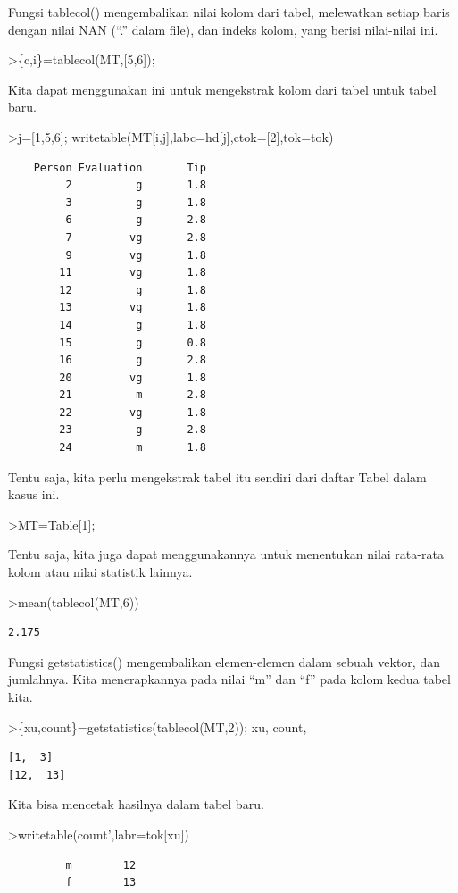 \documentclass[
]{book}
\begin{document}
Fungsi tablecol() mengembalikan nilai kolom dari tabel, melewatkan setiap baris dengan nilai NAN (``.'' dalam file), dan indeks kolom, yang berisi nilai-nilai ini.

\textgreater\{c,i\}=tablecol(MT,{[}5,6{]});

Kita dapat menggunakan ini untuk mengekstrak kolom dari tabel untuk tabel baru.

\textgreater j={[}1,5,6{]}; writetable(MT{[}i,j{]},labc=hd{[}j{]},ctok={[}2{]},tok=tok)

\begin{verbatim}
    Person Evaluation       Tip
         2          g       1.8
         3          g       1.8
         6          g       2.8
         7         vg       2.8
         9         vg       1.8
        11         vg       1.8
        12          g       1.8
        13         vg       1.8
        14          g       1.8
        15          g       0.8
        16          g       2.8
        20         vg       1.8
        21          m       2.8
        22         vg       1.8
        23          g       2.8
        24          m       1.8
\end{verbatim}

Tentu saja, kita perlu mengekstrak tabel itu sendiri dari daftar Tabel dalam kasus ini.

\textgreater MT=Table{[}1{]};

Tentu saja, kita juga dapat menggunakannya untuk menentukan nilai rata-rata kolom atau nilai statistik lainnya.

\textgreater mean(tablecol(MT,6))

\begin{verbatim}
2.175
\end{verbatim}

Fungsi getstatistics() mengembalikan elemen-elemen dalam sebuah vektor, dan jumlahnya. Kita menerapkannya pada nilai ``m'' dan ``f'' pada kolom kedua tabel kita.

\textgreater\{xu,count\}=getstatistics(tablecol(MT,2)); xu, count,

\begin{verbatim}
[1,  3]
[12,  13]
\end{verbatim}

Kita bisa mencetak hasilnya dalam tabel baru.

\textgreater writetable(count',labr=tok{[}xu{]})

\begin{verbatim}
         m        12
         f        13
\end{verbatim}
\end{document}
